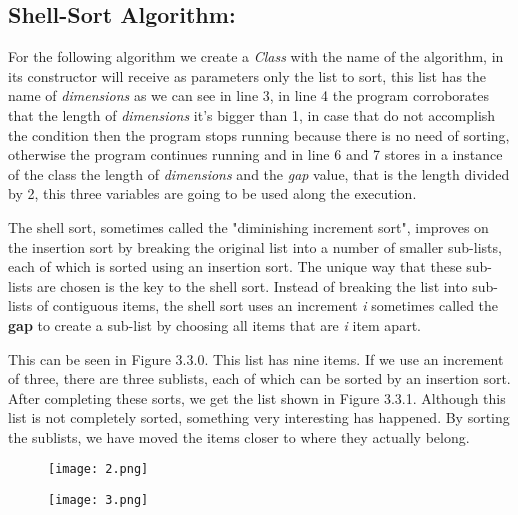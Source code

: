 \subsection{Shell-Sort Algorithm:}

For the following algorithm we create a {\itshape Class} with the name of the algorithm, in its constructor will receive as parameters only the list to sort, this list has the name of {\itshape dimensions} as we can see in line 3, in line 4 the program corroborates that the length of {\itshape dimensions} it's bigger than 1, in case that do not accomplish the condition then the program stops running because there is no need of sorting, otherwise the program continues running and in line 6 and 7 stores in a instance of the class the length of {\itshape dimensions} and the {\itshape gap} value, that is the length divided by 2, this three variables are going to be used along the execution. \hfill \break

The shell sort, sometimes called the "diminishing increment sort", improves on the insertion sort by breaking the original list into a number of smaller sub-lists, each of which is sorted using an insertion sort. The unique way that these sub-lists are chosen is the key to the shell sort. Instead of breaking the list into sub-lists of contiguous items, the shell sort uses an increment {\itshape i} sometimes called the {\bfseries gap}  to create a sub-list by choosing all items that are {\itshape i} item apart.  \hfill \break

This can be seen in Figure 3.3.0. This list has nine items. If we use an increment of three, there are three sublists, each of which can be sorted by an insertion sort. After completing these sorts, we get the list shown in Figure 3.3.1. Although this list is not completely sorted, something very interesting has happened. By sorting the sublists, we have moved the items closer to where they actually belong. \hfill \break

\begin{figure}[H]
\texttt{[image: 2.png]}
\centering \linebreak {}
\end{figure}

\begin{figure}[H]
\texttt{[image: 3.png]}
\centering \linebreak {}
\end{figure} 

